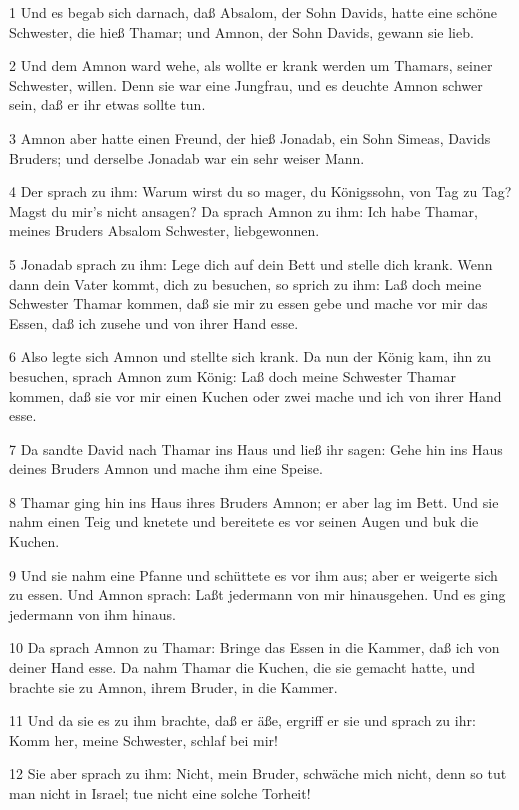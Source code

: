 \par 1 Und es begab sich darnach, daß Absalom, der Sohn Davids, hatte eine schöne Schwester, die hieß Thamar; und Amnon, der Sohn Davids, gewann sie lieb.
\par 2 Und dem Amnon ward wehe, als wollte er krank werden um Thamars, seiner Schwester, willen. Denn sie war eine Jungfrau, und es deuchte Amnon schwer sein, daß er ihr etwas sollte tun.
\par 3 Amnon aber hatte einen Freund, der hieß Jonadab, ein Sohn Simeas, Davids Bruders; und derselbe Jonadab war ein sehr weiser Mann.
\par 4 Der sprach zu ihm: Warum wirst du so mager, du Königssohn, von Tag zu Tag? Magst du mir's nicht ansagen? Da sprach Amnon zu ihm: Ich habe Thamar, meines Bruders Absalom Schwester, liebgewonnen.
\par 5 Jonadab sprach zu ihm: Lege dich auf dein Bett und stelle dich krank. Wenn dann dein Vater kommt, dich zu besuchen, so sprich zu ihm: Laß doch meine Schwester Thamar kommen, daß sie mir zu essen gebe und mache vor mir das Essen, daß ich zusehe und von ihrer Hand esse.
\par 6 Also legte sich Amnon und stellte sich krank. Da nun der König kam, ihn zu besuchen, sprach Amnon zum König: Laß doch meine Schwester Thamar kommen, daß sie vor mir einen Kuchen oder zwei mache und ich von ihrer Hand esse.
\par 7 Da sandte David nach Thamar ins Haus und ließ ihr sagen: Gehe hin ins Haus deines Bruders Amnon und mache ihm eine Speise.
\par 8 Thamar ging hin ins Haus ihres Bruders Amnon; er aber lag im Bett. Und sie nahm einen Teig und knetete und bereitete es vor seinen Augen und buk die Kuchen.
\par 9 Und sie nahm eine Pfanne und schüttete es vor ihm aus; aber er weigerte sich zu essen. Und Amnon sprach: Laßt jedermann von mir hinausgehen. Und es ging jedermann von ihm hinaus.
\par 10 Da sprach Amnon zu Thamar: Bringe das Essen in die Kammer, daß ich von deiner Hand esse. Da nahm Thamar die Kuchen, die sie gemacht hatte, und brachte sie zu Amnon, ihrem Bruder, in die Kammer.
\par 11 Und da sie es zu ihm brachte, daß er äße, ergriff er sie und sprach zu ihr: Komm her, meine Schwester, schlaf bei mir!
\par 12 Sie aber sprach zu ihm: Nicht, mein Bruder, schwäche mich nicht, denn so tut man nicht in Israel; tue nicht eine solche Torheit!
